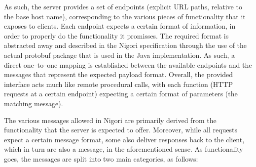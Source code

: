 As such, the server provides a set of endpoints (explicit URL paths, relative to the base host name), corresponding to the various pieces of functionality that it exposes to clients.
Each endpoint expects a certain format of information, in order to properly do the functionality it promisses.
The required format is abstracted away and described in the Nigori specification through the use of the actual protobuf \cite{protobuf} package that is used in the Java implementation.
As such, a direct one--to--one mapping is established between the available endpoints and the messages that represent the expected payload format.
Overall, the provided interface acts much like remote procedural calls, with each function (HTTP requests at a certain endpoint) expecting a certain format of parameters (the matching message).

The various messages allowed in Nigori are primarily derived from the functionality that the server is expected to offer.
Moreover, while all requests expect a certain message format, some also deliver responses back to the client, which in turn are also a message, in the aforementioned sense.
As functionality goes, the messages are split into two main categories, as follows:
